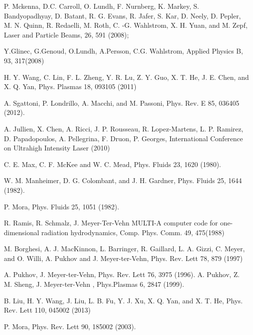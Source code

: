 \documentclass[aip,twocolumn,superscriptaddress,showpacs,amsmath]{revtex4}
\begin{document}
\begin{thebibliography}{28}
 P. Mckenna, D.C. Carroll, O. Lundh, F. Nurnberg, K.
Markey, S. Bandyopadhyay, D. Batant, R. G. Evans, R. Jafer, S. Kar, D. Neely,
D. Pepler, M. N. Quinn, R. Redaelli, M. Roth, C. -G. Wahlstrom, X. H. Yuan,
and M. Zepf, Laser and Particle Beams, 26, 591 (2008);

 Y.Glinec, G.Genoud, O.Lundh, A.Persson, C.G.
Wahlstrom, Applied Physics B, 93, 317(2008)


 H. Y. Wang, C. Lin, F. L. Zheng, Y. R. Lu, Z. Y. Guo,
X. T. He, J. E. Chen, and X. Q. Yan, Phys. Plasmas 18, 093105 (2011)

 A. Sgattoni, P. Londrillo, A. Macchi, and M. Passoni, Phys. Rev. E 85, 036405 (2012).

 A. Jullien, X. Chen, A. Ricci, J. P. Rousseau, R. Lopez-Martens,
L. P. Ramirez, D. Papadopoulos, A. Pellegrina, F. Druon, P. Georges,
International Conference on Ultrahigh Intensity Laser (2010)


 C. E. Max, C. F. McKee and W. C. Mead, Phys. Fluids 23, 1620 (1980).

 W. M. Manheimer, D. G. Colombant, and J. H. Gardner, Phys.
     Fluids 25, 1644 (1982).

 P. Mora, Phys. Fluids 25, 1051 (1982).

 R. Ramis, R. Schmalz, J. Meyer-Ter-Vehn MULTI-A
computer code for one-dimensional radiation hydrodynamics, Comp. Phys. Comm.
49, 475(1988)

  M. Borghesi, A. J. MacKinnon, L. Barringer, R. Gaillard, L. A.
Gizzi, C. Meyer, and O. Willi, A. Pukhov and J. Meyer-ter-Vehn, Phys. Rev.
Lett 78, 879 (1997)



 A. Pukhov, J. Meyer-ter-Vehn, Phys. Rev. Lett 76, 3975 (1996).
 A. Pukhov, Z. M. Sheng, J. Meyer-ter-Vehn , Phys.Plasmas 6, 2847 (1999).

 B. Liu, H. Y. Wang, J. Liu, L. B. Fu, Y. J. Xu, X. Q. Yan, and X. T. He, Phys. Rev. Lett 110,
045002 (2013)




 P. Mora, Phys. Rev. Lett 90, 185002 (2003).










\end{thebibliography}
\end{document}
